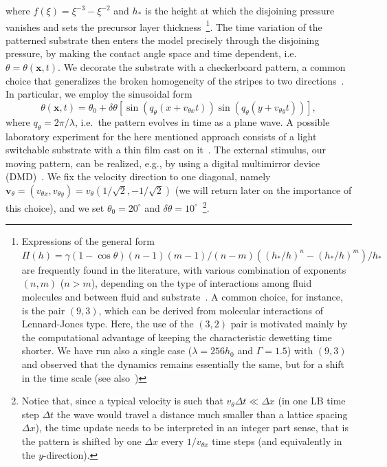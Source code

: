 where $f(\xi)=\xi^{-3} - \xi^{-2}$ and $h_{\ast}$ is the height at which the disjoining pressure vanishes and sets the precursor layer thickness~\footnote{Expressions of 
the general form $\Pi(h) = \gamma(1-\cos \theta)(n-1)(m-1)/(n-m)((h_{\ast}/h)^n - (h_{\ast}/h)^m)/h_{\ast}$
are frequently found in the literature, with various combination of exponents $(n,m)$ ($n>m$), depending
on the type of interactions among fluid molecules and between fluid and substrate~\cite{SCHWARTZ1998173,Mitlin,Teletzke}. A common choice, for instance, is the pair $(9,3)$, which 
can be derived from molecular interactions of Lennard-Jones type. Here, the use of the $(3,2)$ pair is motivated mainly by the computational advantage of keeping the characteristic dewetting time 
shorter. We have run also a single case ($\lambda=256 h_0$ and $\Gamma=1.5$) with $(9,3)$ and observed that 
the dynamics remains essentially the same, but for a shift in the time scale (see also~\cite{PhysRevE.104.034801})}.
The time variation of the patterned substrate then enters the model precisely through the disjoining pressure, by making the contact angle space and time dependent, i.e. $\theta = \theta(\mathbf{x},t)$.
We decorate the substrate with a checkerboard pattern, a common choice that generalizes the broken homogeneity of the stripes to two 
directions~\cite{KarguptaLangmuir2003,Jalali2018,Nagayama2020,Das2020}.
In particular, we employ the sinusoidal form
\begin{equation}\label{eq:sinetheta}
   \!\! \theta(\mathbf{x},t) = \theta_0 + \delta\theta\left[\sin\left(q_{\theta} (x+v_{\theta x}t)\right)\sin\left(q_{\theta}(y+v_{\theta y}t)\right)\right],\! 
\end{equation}
where $q_{\theta} = 2\pi/\lambda$, i.e.~the pattern evolves in time as a plane wave.
A possible laboratory experiment for the here mentioned approach consists of a light switchable substrate with a thin film cast on it~\cite{becker2003complex, IchimuraEtAl_Science2000}. 
The external stimulus, our moving pattern, can be realized, e.g., by using a digital multimirror device (DMD)~\cite{doi:10.1021/jp301092y,doi:10.1126/science.aax8760}.
We fix the velocity direction to one diagonal, namely $\mathbf{v}_{\theta} = (v_{\theta x},v_{\theta y}) = v_{\theta}(1/\sqrt{2},-1/\sqrt{2})$ (we will return later on the importance of this choice), and we set $\theta_0 = 20^{\circ}$ and $\delta\theta=10^{\circ}$~\footnote{Notice that, since a typical velocity is such that $v_{\theta} \Delta t \ll \Delta x$ (in one LB time step $\Delta t$ the wave would travel a distance much smaller than a lattice spacing $\Delta x$),
the time update needs to be interpreted in an integer part sense, that is the pattern is shifted by one $\Delta x$ every $1/v_{\theta x}$ time steps (and equivalently in the $y$-direction).}.
